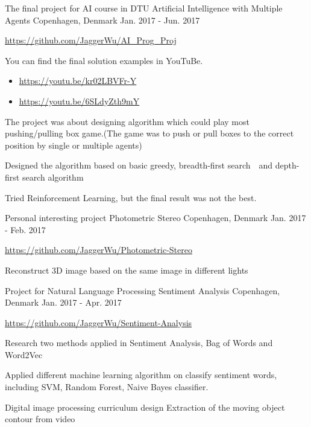 \begin{cventries}
    {The final project for AI course in DTU}
    {Artificial Intelligence with Multiple Agents}
    {Copenhagen, Denmark}
    {Jan. 2017 - Jun. 2017}
    {
      \begin{cvitems}
        \item {\url{https://github.com/JaggerWu/AI_Prog_Proj}}
        \item {You can find the final solution examples in YouTuBe.
        \begin{itemize}
            \item \url{https://youtu.be/kr02LBVFr-Y}
            \item \url{https://youtu.be/6SLdyZth9mY}
        \end{itemize}}
        \item {The project was about designing algorithm which could play most pushing/pulling box game.(The game was to push or pull boxes to the correct position by single or multiple agents)}
        \item {Designed the algorithm based on basic greedy, breadth-first search　and depth-first search algorithm}
        \item {Tried Reinforcement Learning, but the final result was not the best.}
      \end{cvitems}
    }
  \cventry
    {Personal interesting project}
    {Photometric Stereo}
    {Copenhagen, Denmark}
    {Jan. 2017 - Feb. 2017}
    {
      \begin{cvitems}
        \item {\url{https://github.com/JaggerWu/Photometric-Stereo}}
        \item {Reconstruct 3D image based on the same image in different lights}
      \end{cvitems} 
    }
  \cventry
    {Project for Natural Language Processing}
    {Sentiment Analysis}
    {Copenhagen, Denmark}
    {Jan. 2017 - Apr. 2017}
    {
      \begin{cvitems}
        \item {\url{https://github.com/JaggerWu/Sentiment-Analysis}}
        \item {Research two methods applied in Sentiment Analysis, Bag of Words and Word2Vec}
        \item {Applied different machine learning algorithm on classify sentiment words, including SVM, Random Forest, Naive Bayes classifier.}
      \end{cvitems} 
    }
  \cventry
    {Digital image processing curriculum design}
    {Extraction of  the moving object contour from video}

\end{cventries}
